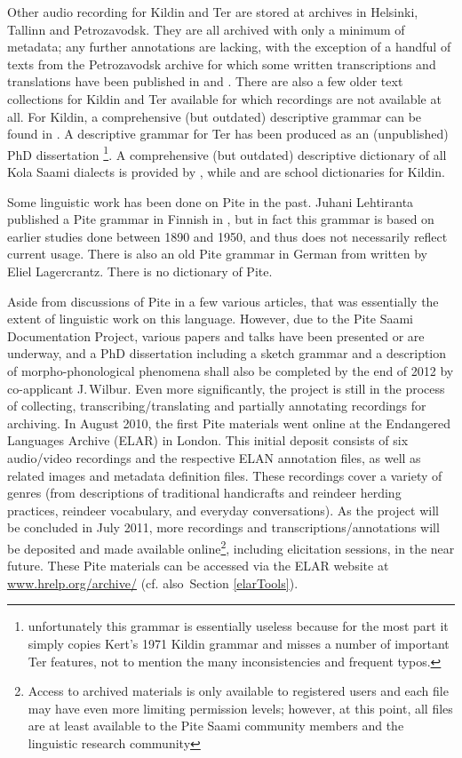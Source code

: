 \documentclass[a4paper,12pt]{article}
\begin{document}
Other audio recording for Kildin and Ter are stored at archives in Helsinki, Tallinn and Petrozavodsk. They are all archived with only a minimum of metadata; any further annotations are lacking, with the exception of a handful of texts from the Petrozavodsk archive for which some written transcriptions and translations have been published in \citealt{kert1961} and \citealt{panfilov-etal1988}. There are also a few older text collections for Kildin and Ter available for which recordings are not available at all. For Kildin, a comprehensive (but outdated) descriptive grammar can be found in \citealt{kert1971}. A descriptive grammar for Ter has been produced as an (unpublished) PhD dissertation \cite{tereskin2002a}\footnote{unfortunately this grammar is essentially useless because for the most part it simply copies Kert's 1971 Kildin grammar and misses a number of important Ter features, not to mention the many inconsistencies and frequent typos.}. A comprehensive (but outdated) descriptive dictionary of all Kola Saami dialects is provided by \citealt{itkonen_t_i1958a}, while \citealt{kuruc-etal1985} and \citealt{kert1986} are school dictionaries for Kildin.

Some linguistic work has been done on Pite in the past. Juhani Lehtiranta published a Pite grammar in Finnish in \citeyear{lehtiranta1992}, but in fact this grammar is based on earlier studies done between 1890 and 1950, and thus does not necessarily reflect current usage. There is also an old Pite grammar in German from \citeyear{lagercrantz1926} written by Eliel Lagercrantz. There is no dictionary of Pite.

Aside from discussions of Pite in a few various articles, that was essentially the extent of linguistic work on this language. However, due to the Pite Saami Documentation Project, various papers and talks have been presented or are underway, and a PhD dissertation including a sketch grammar and a description of morpho-phonological phenomena shall also be completed by the end of 2012 by co-applicant J.\,Wilbur. Even more significantly, the project is still in the process of collecting, transcribing/translating and partially annotating recordings for archiving. In August 2010, the first Pite materials went online at the Endangered Languages Archive (ELAR) in London. This initial deposit consists of six audio/video recordings and the respective ELAN annotation files, as well as related images and metadata definition files. These recordings cover a variety of genres (from descriptions of traditional handicrafts and reindeer herding practices, reindeer vocabulary, and everyday conversations). As the project will be concluded in July 2011, more recordings and transcriptions/annotations will be deposited and made available online\footnote{Access to archived materials is only available to registered users and each file may have even more limiting permission levels; however, at this point, all files are at least available to the Pite Saami community members and the linguistic research community}, including elicitation sessions, in the near future. These Pite materials can be accessed via the ELAR website at \url{www.hrelp.org/archive/} (cf. also~Section \ref{elarTools}).
\end{document}
